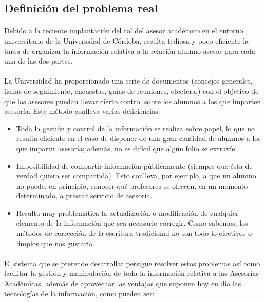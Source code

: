 \subsection{Definición del problema real}

\paragraph{}Debido a la reciente implantación del rol del asesor académico en el
entorno
universitario de la Universidad de Córdoba, resulta tediosa y poco eficiente la
tarea de organizar la información relativa a la relación alumno-asesor para
cada una de las dos partes.

\paragraph{}La Universidad ha proporcionado una serie de documentos (consejos
generales, fichas de seguimiento, encuestas, guías de reuniones, etcétera.) con
el objetivo de que los asesores puedan llevar cierto control sobre los alumnos
a los que imparten asesoría. Este método conlleva varias deficiencias:

\begin{itemize}
 \item Toda la gestión y control de la información se realiza sobre papel, lo
       que no resulta eficiente en el caso de disponer de una gran cantidad de
       alumnos a los que impartir asesoría; además, no es difícil que algún
       folio se extravíe.
 \item Imposibilidad de compartir información públicamente (siempre que ésta
       de verdad quiera ser compartida). Esto conlleva, por ejemplo, a que un
       alumno no puede, en principio, conocer qué profesores se ofrecen, en un
       momento determinado, a prestar servicio de asesoría.
 \item Resulta muy problemática la actualización o modificación de cualquier
       elemento de la información que sea necesario corregir. Como sabemos, los
       métodos de corrección de la escritura tradicional no son todo lo
       efectivos o limpios que nos gustaría.
\end{itemize}

\paragraph{}El sistema que se pretende desarrollar persigue resolver estos
problemas así
como facilitar la gestión y manipulación de toda la información relativa a
las Asesorías Académicas, además de aprovechar las ventajas que suponen hoy en
día las tecnologías de la información, como pueden ser:

